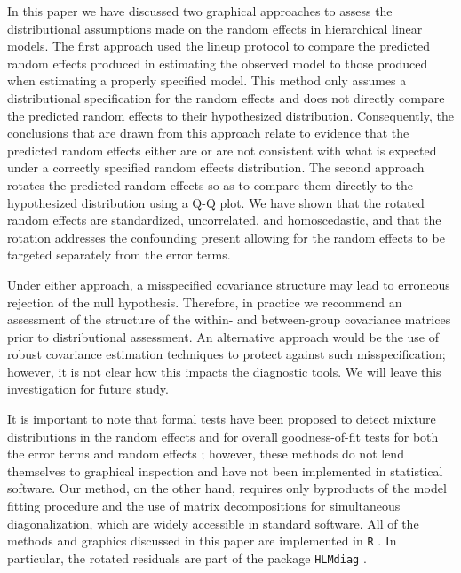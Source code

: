 \documentclass[12pt]{article} %
\newcommand{\al}[1]{{\color{red} #1}}
\begin{document}
In this paper we have discussed two graphical approaches to assess the distributional assumptions made on the random effects in hierarchical linear models. The first approach used the lineup protocol to compare the predicted random effects produced in estimating the observed model to those produced when estimating a properly specified model. This method only assumes a distributional specification for the random effects and does not directly compare the predicted random effects to their hypothesized distribution. Consequently, the conclusions that are drawn from this approach relate to evidence that the predicted random effects either are or are not {consistent} with what is expected under a correctly specified random effects distribution. The second approach rotates the predicted random effects so as to compare them directly to the hypothesized distribution using a Q-Q plot. We have shown that the rotated random effects are standardized, uncorrelated, and homoscedastic, and that the rotation addresses the confounding present allowing for the random effects to be targeted separately from the error terms. 

Under either approach, a misspecified covariance structure may lead to erroneous rejection of the null hypothesis. Therefore, in practice we recommend an assessment of the structure of {the within- and between-group covariance matrices} prior to distributional assessment.
An alternative approach would be the use of robust covariance estimation techniques to protect against such misspecification; however, {it is not clear how this impacts the diagnostic tools. We will leave this investigation for future study.} %

It is important to note that formal tests have been proposed  to detect mixture distributions in the random effects \citep{Verbeke:1996va} and for overall goodness-of-fit tests for both the error terms and random effects \citep{Jiang:2001dx}; however, these methods do not lend themselves to graphical inspection and have not been implemented in statistical software. Our method, on the other hand, requires only byproducts of the model fitting procedure and the use of matrix decompositions for simultaneous diagonalization, which are widely accessible in standard software. All of the methods and graphics discussed in this paper are implemented in  \texttt{R} \citep{R}. In particular, the rotated residuals are part of the package \texttt{HLMdiag} \citep{HLMdiag, Loy:JSS}.
\end{document}
